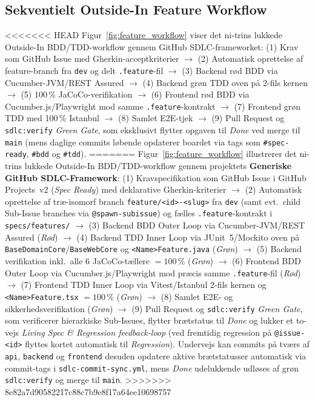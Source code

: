 \documentclass[11pt,a4paper]{article}
\begin{document}
\begin{table}[htbp]
\subsection{Sekventielt Outside-In Feature Workflow}
<<<<<<< HEAD
Figur~\ref{fig:feature_workflow} viser det ni-trins lukkede Outside-In BDD/TDD-workflow gennem GitHub SDLC-frameworket: (1) Krav som GitHub Issue med Gherkin-acceptkriterier $\rightarrow$ (2) Automatisk oprettelse af feature-branch fra \texttt{dev} og delt \texttt{.feature}-fil $\rightarrow$ (3) Backend rød BDD via Cucumber-JVM/REST Assured $\rightarrow$ (4) Backend grøn TDD oven på 2-fils kernen $\rightarrow$ (5) 100\,\% JaCoCo-verifikation $\rightarrow$ (6) Frontend rød BDD via Cucumber.js/Playwright mod samme \texttt{.feature}-kontrakt $\rightarrow$ (7) Frontend grøn TDD med 100\,\% Istanbul $\rightarrow$ (8) Samlet E2E-tjek $\rightarrow$ (9) Pull Request og \texttt{sdlc:verify} \textit{Green Gate}, som eksklusivt flytter opgaven til \textit{Done} ved merge til \texttt{main} (mens daglige commits løbende opdaterer boardet via tags som \texttt{\#spec-ready}, \texttt{\#bdd} og \texttt{\#tdd}).
=======
Figur~\ref{fig:feature_workflow} illustrerer det ni-trins lukkede Outside-In BDD/TDD-workflow gennem projektets \textbf{Generiske GitHub SDLC-Framework}: (1) Kravspecifikation som GitHub Issue i GitHub Projects~v2 (\textit{Spec Ready}) med deklarative Gherkin-kriterier $\rightarrow$ (2) Automatisk oprettelse af træ-isomorf branch \texttt{feature/<id>-<slug>} fra \texttt{dev} (samt evt.\ child Sub-Issue branches via \texttt{@spawn-subissue}) og fælles \texttt{.feature}-kontrakt i \texttt{specs/features/} $\rightarrow$ (3) Backend BDD Outer Loop via Cucumber-JVM/REST Assured (\textit{Rød}) $\rightarrow$ (4) Backend TDD Inner Loop via JUnit~5/Mockito oven på \texttt{BaseDomainCore}/\texttt{BaseWebCore} og \texttt{<Name>Feature.java} (\textit{Grøn}) $\rightarrow$ (5) Backend verifikation inkl.\ alle 6 JaCoCo-tællere $= 100\,\%$ (\textit{Grøn}) $\rightarrow$ (6) Frontend BDD Outer Loop via Cucumber.js/Playwright mod præcis samme \texttt{.feature}-fil (\textit{Rød}) $\rightarrow$ (7) Frontend TDD Inner Loop via Vitest/Istanbul 2-fils kernen og \texttt{<Name>Feature.tsx} $= 100\,\%$ (\textit{Grøn}) $\rightarrow$ (8) Samlet E2E- og sikkerhedsverifikation (\textit{Grøn}) $\rightarrow$ (9) Pull Request og \texttt{sdlc:verify} \textit{Green Gate}, som verificerer hierarkiske Sub-Issues, flytter brætstatus til \textit{Done} og lukker et to-vejs \textit{Living Spec \& Regression feedback-loop} (ved fremtidig regression på \texttt{@issue-<id>} flyttes kortet automatisk til \textit{Regression}). Undervejs kan commits på tværs af \texttt{api}, \texttt{backend} og \texttt{frontend} desuden opdatere aktive brætstatusser automatisk via commit-tags i \texttt{sdlc-commit-sync.yml}, mens \textit{Done} udelukkende udløses af grøn \texttt{sdlc:verify} og merge til \texttt{main}.
>>>>>>> 8e82a7d90582217c88c7b9e8f17a64ee10698757


\end{table}
\end{document}
